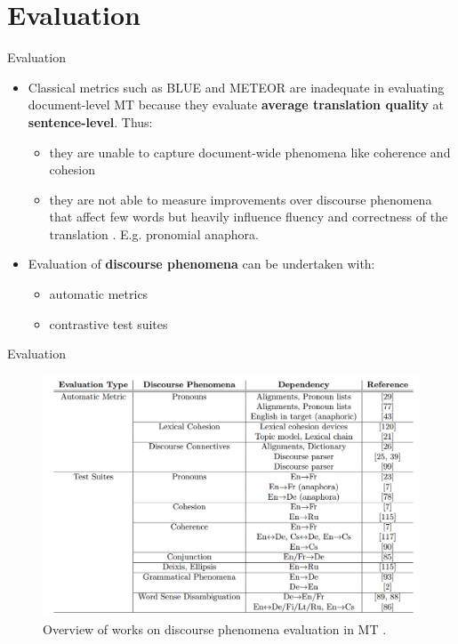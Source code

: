 \section{Evaluation}

\begin{frame}{Evaluation}
	
	\begin{itemize}
		\item Classical metrics such as BLUE and METEOR are inadequate in evaluating document-level MT because they evaluate \textbf{average translation quality} at \textbf{sentence-level}. Thus:
		\begin{itemize}
			\item they are unable to capture document-wide phenomena like coherence and cohesion \cite{wong_extending_2012}
			\item they are not able to measure improvements over discourse phenomena that affect few words but heavily influence fluency and correctness of the translation \cite{muller_large-scale_2018}. E.g. pronomial anaphora.
		\end{itemize}
		\item Evaluation of \textbf{discourse phenomena} can be undertaken with:
			\begin{itemize}
				\item automatic metrics
				\item contrastive test suites
			\end{itemize}
	\end{itemize}

\end{frame}

\begin{frame}{Evaluation}
	
	\begin{figure}
		\centering
		\includegraphics[width=0.7\linewidth]{Images/maruf_2019_discourse_phenomena}
		\caption{Overview of works on discourse phenomena evaluation in MT \cite{maruf_survey_2019}.}
			\label{fig:maruf2019discoursephenomena}
	\end{figure}
		
\end{frame}


